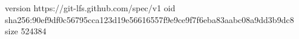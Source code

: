 version https://git-lfs.github.com/spec/v1
oid sha256:90ef9df0c56795cca123d19e56616557f9e9ce9f7f6eba83aabc08a9dd3b9dc8
size 524384
